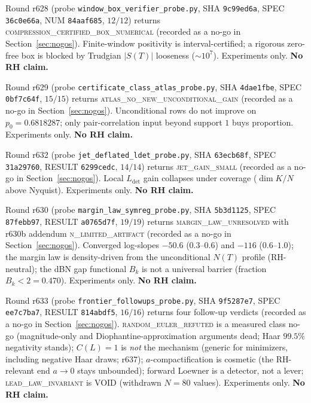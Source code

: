 \documentclass[11pt]{article}
\theoremstyle{definition}
\theoremstyle{remark}
\begin{document}
\noindent Round r628 (probe \texttt{window\_box\_verifier\_probe.py},
SHA \texttt{9c99ed6a}, SPEC \texttt{36c0e66a}, NUM
\texttt{84aaf685}, $12/12$) returns
\textsc{compression\_certified\_box\_numerical}
(recorded as a no-go in Section~\ref{sec:nogos}).  Finite-window
positivity is interval-certified; a rigorous zero-free box is
blocked by Trudgian $\lvert S(T)\rvert$ looseness
($\sim 10^{7}$).  Experiments only.  \textbf{No RH claim.}

\noindent Round r629 (probe \texttt{certificate\_class\_atlas\_probe.py},
SHA \texttt{4dae1fbe}, SPEC \texttt{0bf7c64f}, $15/15$) returns
\textsc{atlas\_no\_new\_unconditional\_gain}
(recorded as a no-go in Section~\ref{sec:nogos}).  Unconditional
rows do not improve on $p_0=0.6818287$; only pair-correlation
input beyond support $1$ buys proportion.  Experiments only.
\textbf{No RH claim.}

\noindent Round r632 (probe \texttt{jet\_deflated\_ldet\_probe.py},
SHA \texttt{63ecb68f}, SPEC \texttt{31a29760}, RESULT
\texttt{6299cedc}, $14/14$) returns \textsc{jet\_gain\_small}
(recorded as a no-go in Section~\ref{sec:nogos}).  Local
$L_{\mathrm{det}}$ gain collapses under coverage
($\dim K/N$ above Nyquist).  Experiments only.
\textbf{No RH claim.}

\noindent Round r630 (probe \texttt{margin\_law\_symreg\_probe.py},
SHA \texttt{5b3d1125}, SPEC \texttt{87febb97}, RESULT
\texttt{a0765d7f}, $19/19$) returns
\textsc{margin\_law\_unresolved} with r630b addendum
\textsc{n\_limited\_artifact} (recorded as a no-go in
Section~\ref{sec:nogos}).  Converged log-slopes $-50.6$
($0.3$--$0.6$) and $-116$ ($0.6$--$1.0$); the margin law is
density-driven from the unconditional $N(T)$ profile
(RH-neutral); the dBN gap functional $B_k$ is not a
universal barrier (fraction $B_k<2=0.470$).  Experiments
only.  \textbf{No RH claim.}

\noindent Round r633 (probe \texttt{frontier\_followups\_probe.py},
SHA \texttt{9f5287e7}, SPEC \texttt{ee7c7ba7}, RESULT
\texttt{814abdf5}, $16/16$) returns four follow-up verdicts
(recorded as a no-go in Section~\ref{sec:nogos}).
\textsc{random\_euler\_refuted} is a measured class no-go
(magnitude-only and Diophantine-approximation arguments
dead; Haar $99.5\%$ negativity stands); $C(L)=1$ is
\emph{not} the mechanism (generic for minimizers, including
negative Haar draws; r637); $a$-compactification is cosmetic
(the RH-relevant end $a\to 0$ stays unbounded); forward
Loewner is a detector, not a lever;
\textsc{lead\_law\_invariant} is VOID (withdrawn $N=80$
values).  Experiments only.  \textbf{No RH claim.}
\end{document}
